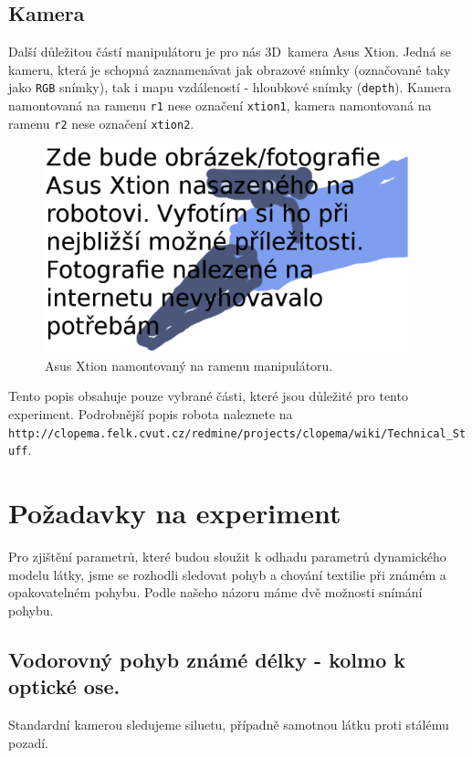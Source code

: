 \documentclass[10pt,a4paper,titlepage,oneside]{report}
\begin{document}
\subsection{Kamera}
\label{subsec:camera}
Další důležitou částí manipulátoru je pro nás 3D~kamera Asus Xtion. Jedná se kameru, která je schopná zaznamenávat jak obrazové snímky (označované taky jako \verb|RGB| snímky), tak i mapu vzdáleností - hloubkové snímky (\verb|depth|). Kamera namontovaná na ramenu \verb|r1| nese označení \verb|xtion1|, kamera namontovaná na ramenu \verb|r2| nese označení \verb|xtion2|.


\begin{figure}[H]
	\centering  	
  	\includegraphics[height=6cm]{pictures/xtion.eps}
  	\caption[]{Asus Xtion namontovaný na ramenu manipulátoru.  	
  	}
  	\label{fig:xtion}
\end{figure}

\noindent Tento popis obsahuje pouze vybrané části, které jsou důležité pro tento experiment. Podrobnější popis robota naleznete na \verb|http://clopema.felk.cvut.cz/redmine/projects/clopema/wiki/Technical_Stuff|. \\




\newpage

\section{Požadavky na experiment}
\label{sec:experiment}
Pro zjištění parametrů, které budou sloužit k odhadu parametrů dynamického modelu látky, jsme se rozhodli sledovat pohyb a chování textilie při známém a opakovatelném pohybu. 
Podle našeho názoru máme dvě možnosti snímání pohybu.

\subsection{Vodorovný pohyb známé délky - kolmo k optické ose.}
Standardní kamerou sledujeme siluetu, případně samotnou látku proti stálému pozadí.
\end{document}
